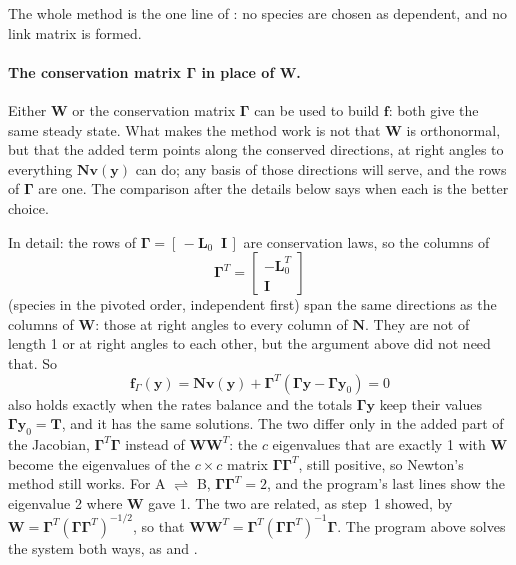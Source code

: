 \documentclass[11pt,a4paper,openany]{report}
\begin{document}
{{The whole method is the one line of : no species are chosen as
dependent, and no link matrix is formed.

\paragraph{The conservation matrix $\mathbf{\Gamma}$ in place of
$\mathbf{W}$.} Either $\mathbf{W}$ or the conservation matrix
$\mathbf{\Gamma}$ can be used to build $\mathbf{f}$: both give the same
steady state. What makes the method work is not that $\mathbf{W}$ is
orthonormal, but that the added term points along the conserved
directions, at right angles to everything $\mathbf{N}
\mathbf{v}(\mathbf{y})$ can do; any basis of those directions will serve,
and the rows of $\mathbf{\Gamma}$ are one. The comparison after the
details below says when each is the better choice.

In detail: the rows of $\mathbf{\Gamma} = [\,-\mathbf{L}_0
\;\; \mathbf{I}\,]$ are conservation laws, so the columns of
\[
  \mathbf{\Gamma}^T = \begin{bmatrix} -\mathbf{L}_0^T \\ \mathbf{I}
  \end{bmatrix}
\]
(species in the pivoted order, independent first) span the same directions
as the columns of $\mathbf{W}$: those at right angles to every column of
$\mathbf{N}$. They are not of length 1 or at right angles to each other,
but the argument above did not need that. So
\[
  \mathbf{f}_\Gamma(\mathbf{y}) = \mathbf{N} \mathbf{v}(\mathbf{y}) + \mathbf{\Gamma}^T (\mathbf{\Gamma} \mathbf{y} -
  \mathbf{\Gamma} \mathbf{y}_0) = 0
\]
also holds exactly when the rates balance and the totals $\mathbf{\Gamma}
\mathbf{y}$ keep their values $\mathbf{\Gamma} \mathbf{y}_0 = \mathbf{T}$, and it has the same
solutions. The two differ only in the added part of the Jacobian,
$\mathbf{\Gamma}^T \mathbf{\Gamma}$ instead of $\mathbf{W}\mathbf{W}^T$: the
$c$ eigenvalues that are exactly 1 with $\mathbf{W}$ become the eigenvalues
of the $c \times c$ matrix $\mathbf{\Gamma}\mathbf{\Gamma}^T$, still
positive, so Newton's method still works. For A $\rightleftharpoons$ B,
$\mathbf{\Gamma}\mathbf{\Gamma}^T = 2$, and the program's last lines show
the eigenvalue 2 where $\mathbf{W}$ gave 1. The two are related, as
step~1 showed, by $\mathbf{W} = \mathbf{\Gamma}^T
(\mathbf{\Gamma}\mathbf{\Gamma}^T)^{-1/2}$, so that
$\mathbf{W}\mathbf{W}^T = \mathbf{\Gamma}^T
(\mathbf{\Gamma}\mathbf{\Gamma}^T)^{-1} \mathbf{\Gamma}$. The program
 above solves the system both ways, as  and
.

}}
\end{document}
